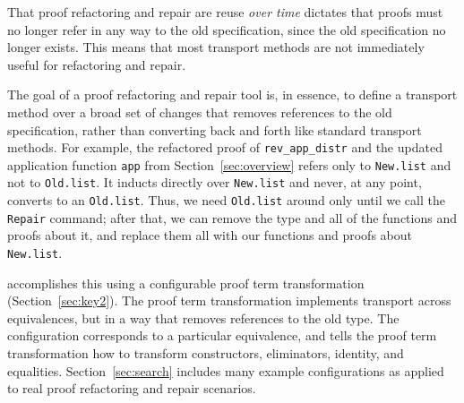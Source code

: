 That proof refactoring and repair are reuse \textit{over time} dictates that proofs
must no longer refer in any way to the old specification, since the old specification no longer exists.
This means that most transport methods %
are not immediately useful for refactoring and repair.

The goal of a proof refactoring and repair tool is, in essence, to
define a transport method over a broad set of changes that
removes references to the old specification, rather than converting back and forth
like standard transport methods.
For example, the refactored proof of \lstinline{rev_app_distr} and the updated application function \lstinline{app}
from Section~\ref{sec:overview} refers only to \lstinline{New.list} and not to \lstinline{Old.list}.
It inducts directly over \lstinline{New.list} and never, at any point, converts to an \lstinline{Old.list}.
Thus, we need \lstinline{Old.list} around only until we call the \lstinline{Repair} command;
after that, we can remove the type and all of the functions and proofs about it, and replace them all with
our functions and proofs about \lstinline{New.list}.

\toolname accomplishes this using a configurable proof term transformation (Section~\ref{sec:key2}).
The proof term transformation implements transport across equivalences, but in a way that removes
references to the old type.
The configuration corresponds to a particular equivalence, and tells the proof term transformation how to transform
constructors, eliminators, identity, and equalities.
Section~\ref{sec:search} includes many example configurations as applied to real proof refactoring and repair scenarios.


